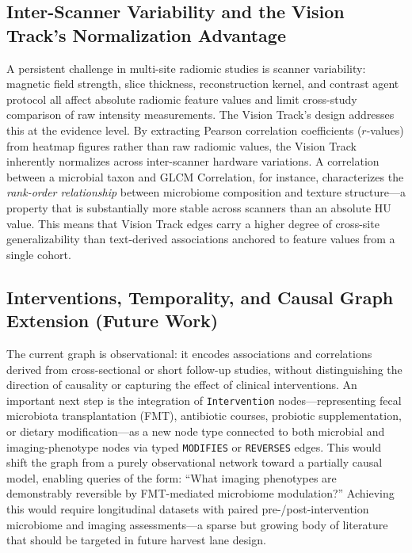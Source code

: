 \documentclass[12pt, letterpaper]{article}
\begin{document}
\subsection{Inter-Scanner Variability and the Vision Track's Normalization Advantage}

A persistent challenge in multi-site radiomic studies is scanner variability: magnetic field strength, slice thickness, reconstruction kernel, and contrast agent protocol all affect absolute radiomic feature values and limit cross-study comparison of raw intensity measurements. The Vision Track's design addresses this at the evidence level. By extracting Pearson correlation coefficients ($r$-values) from heatmap figures rather than raw radiomic values, the Vision Track inherently normalizes across inter-scanner hardware variations. A correlation between a microbial taxon and GLCM Correlation, for instance, characterizes the \textit{rank-order relationship} between microbiome composition and texture structure---a property that is substantially more stable across scanners than an absolute HU value. This means that Vision Track edges carry a higher degree of cross-site generalizability than text-derived associations anchored to feature values from a single cohort.

\subsection{Interventions, Temporality, and Causal Graph Extension (Future Work)}

The current graph is observational: it encodes associations and correlations derived from cross-sectional or short follow-up studies, without distinguishing the direction of causality or capturing the effect of clinical interventions. An important next step is the integration of \texttt{Intervention} nodes---representing fecal microbiota transplantation (FMT), antibiotic courses, probiotic supplementation, or dietary modification---as a new node type connected to both microbial and imaging-phenotype nodes via typed \texttt{MODIFIES} or \texttt{REVERSES} edges. This would shift the graph from a purely observational network toward a partially causal model, enabling queries of the form: ``What imaging phenotypes are demonstrably reversible by FMT-mediated microbiome modulation?'' Achieving this would require longitudinal datasets with paired pre-/post-intervention microbiome and imaging assessments---a sparse but growing body of literature that should be targeted in future harvest lane design.
\end{document}
